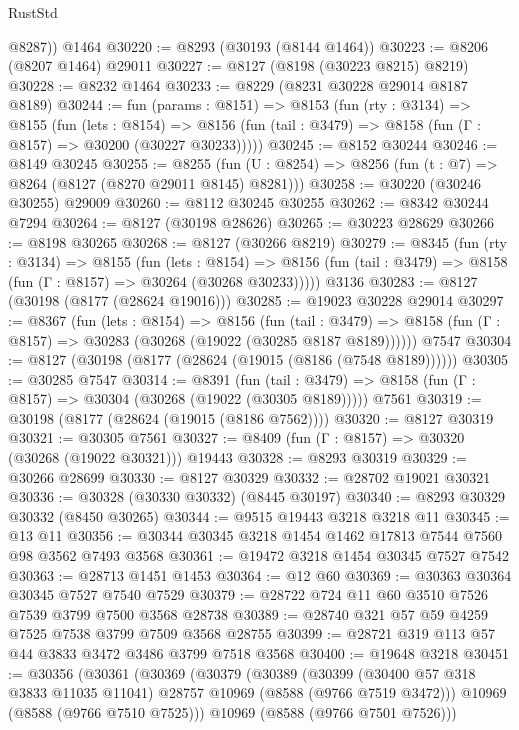 \begin{lexlean}{RustStd}
\begin{coremodule}
        @8287))
    @1464
@30220 := @8293 (@30193 (@8144 @1464))
@30223 := @8206 (@8207 @1464) @29011
@30227 := @8127 (@8198 (@30223 @8215) @8219)
@30228 := @8232 @1464
@30233 := @8229 (@8231 @30228 @29014 @8187 @8189)
@30244 := fun (params : @8151) =>
  @8153
    (fun (rty : @3134) =>
    @8155
      (fun (lets : @8154) =>
      @8156 (fun (tail : @3479) => @8158 (fun (Γ : @8157) => @30200 (@30227 @30233)))))
@30245 := @8152 @30244
@30246 := @8149 @30245
@30255 := @8255
    (fun (U : @8254) => @8256 (fun (t : @7) => @8264 (@8127 (@8270 @29011 @8145) @8281)))
@30258 := @30220 (@30246 @30255) @29009
@30260 := @8112 @30245 @30255
@30262 := @8342 @30244 @7294
@30264 := @8127 (@30198 @28626)
@30265 := @30223 @28629
@30266 := @8198 @30265
@30268 := @8127 (@30266 @8219)
@30279 := @8345
    (fun (rty : @3134) =>
    @8155
      (fun (lets : @8154) =>
      @8156 (fun (tail : @3479) => @8158 (fun (Γ : @8157) => @30264 (@30268 @30233)))))
    @3136
@30283 := @8127 (@30198 (@8177 (@28624 @19016)))
@30285 := @19023 @30228 @29014
@30297 := @8367
    (fun (lets : @8154) =>
    @8156
      (fun (tail : @3479) =>
      @8158 (fun (Γ : @8157) => @30283 (@30268 (@19022 (@30285 @8187 @8189))))))
    @7547
@30304 := @8127 (@30198 (@8177 (@28624 (@19015 (@8186 (@7548 @8189))))))
@30305 := @30285 @7547
@30314 := @8391
    (fun (tail : @3479) => @8158 (fun (Γ : @8157) => @30304 (@30268 (@19022 (@30305 @8189)))))
    @7561
@30319 := @30198 (@8177 (@28624 (@19015 (@8186 @7562))))
@30320 := @8127 @30319
@30321 := @30305 @7561
@30327 := @8409 (fun (Γ : @8157) => @30320 (@30268 (@19022 @30321))) @19443
@30328 := @8293 @30319
@30329 := @30266 @28699
@30330 := @8127 @30329
@30332 := @28702 @19021 @30321
@30336 := @30328 (@30330 @30332) (@8445 @30197)
@30340 := @8293 @30329 @30332 (@8450 @30265)
@30344 := @9515 @19443 @3218 @3218 @11
@30345 := @13 @11
@30356 := @30344 @30345 @3218 @1454 @1462 @17813 @7544 @7560 @98 @3562 @7493 @3568
@30361 := @19472 @3218 @1454 @30345 @7527 @7542
@30363 := @28713 @1451 @1453
@30364 := @12 @60
@30369 := @30363 @30364 @30345 @7527 @7540 @7529
@30379 := @28722 @724 @11 @60 @3510 @7526 @7539 @3799 @7500 @3568 @28738
@30389 := @28740 @321 @57 @59 @4259 @7525 @7538 @3799 @7509 @3568 @28755
@30399 := @28721 @319 @113 @57 @44 @3833 @3472 @3486 @3799 @7518 @3568
@30400 := @19648 @3218
@30451 := @30356
    (@30361
      (@30369
        (@30379
          (@30389
            (@30399 (@30400 @57 @318 @3833 @11035 @11041) @28757 @10969 (@8588 (@9766 @7519 @3472)))
            @10969
            (@8588 (@9766 @7510 @7525)))
          @10969
          (@8588 (@9766 @7501 @7526)))

\end{coremodule}
\end{lexlean}
